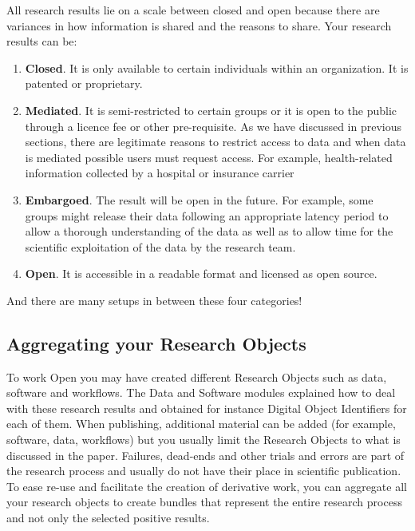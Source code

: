 \documentclass[
  letterpaper,
  DIV=11,
  numbers=noendperiod]{scrreport}
\providecommand{\tightlist}{%
  \setlength{\itemsep}{0pt}\setlength{\parskip}{0pt}}\usepackage{longtable,booktabs,array}
\begin{document}
All research results lie on a scale between closed and open because
there are variances in how information is shared and the reasons to
share. Your research results can be:

\begin{enumerate}
\def\labelenumi{\arabic{enumi}.}
\tightlist
\item
  \textbf{Closed}. It is only available to certain individuals within an
  organization. It is patented or proprietary.
\item
  \textbf{Mediated}. It is semi-restricted to certain groups or it is
  open to the public through a licence fee or other pre-requisite. As we
  have discussed in previous sections, there are legitimate reasons to
  restrict access to data and when data is mediated possible users must
  request access. For example, health-related information collected by a
  hospital or insurance carrier
\item
  \textbf{Embargoed}. The result will be open in the future. For
  example, some groups might release their data following an appropriate
  latency period to allow a thorough understanding of the data as well
  as to allow time for the scientific exploitation of the data by the
  research team.
\item
  \textbf{Open}. It is accessible in a readable format and licensed as
  open source.
\end{enumerate}

And there are many setups in between these four categories!

\hypertarget{aggregating-your-research-objects}{%
\subsection{Aggregating your Research
Objects}\label{aggregating-your-research-objects}}

To work Open you may have created different Research Objects such as
data, software and workflows. The Data and Software modules explained
how to deal with these research results and obtained for instance
Digital Object Identifiers for each of them. When publishing, additional
material can be added (for example, software, data, workflows) but you
usually limit the Research Objects to what is discussed in the paper.
Failures, dead-ends and other trials and errors are part of the research
process and usually do not have their place in scientific publication.
To ease re-use and facilitate the creation of derivative work, you can
aggregate all your research objects to create bundles that represent the
entire research process and not only the selected positive results.
\end{document}
